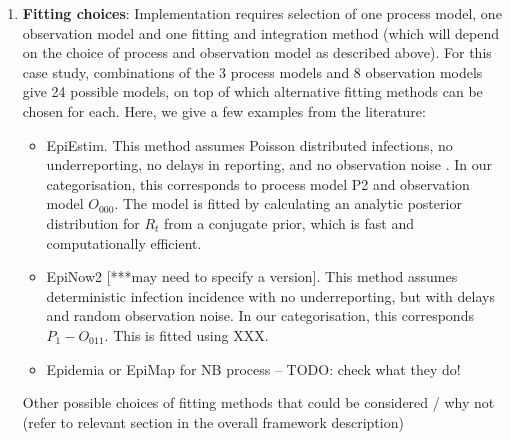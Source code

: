 \documentclass{article}
\begin{document}
\begin{enumerate}
\item \textbf{Fitting choices}: Implementation requires selection of one process model, one observation model and one fitting and integration method (which will depend on the choice of process and observation model as described above). For this case study, combinations of the 3 process models and 8 observation models give 24 possible models, on top of which alternative fitting methods can be chosen for each. Here, we give a few examples from the literature:
\begin{itemize}
    \item EpiEstim. This method assumes Poisson distributed infections, no underreporting, no delays in reporting, and no observation noise \citep{cori2013new}. In our categorisation, this corresponds to process model P2 and observation model $O_{000}$. The model is fitted by calculating an analytic posterior distribution for $R_t$ from a conjugate prior, which is fast and computationally efficient. 
    \item EpiNow2 [***may need to specify a version]. This method assumes deterministic infection incidence with no underreporting, but with delays and random observation noise. In our categorisation, this corresponds $P_1-O_{011}$. This is fitted using XXX.
    \item Epidemia or EpiMap for NB process – TODO: check what they do!
\end{itemize}

Other possible choices of fitting methods that could be considered / why not (refer to relevant section in the overall framework description)
 \end{enumerate}
 


\end{document}
